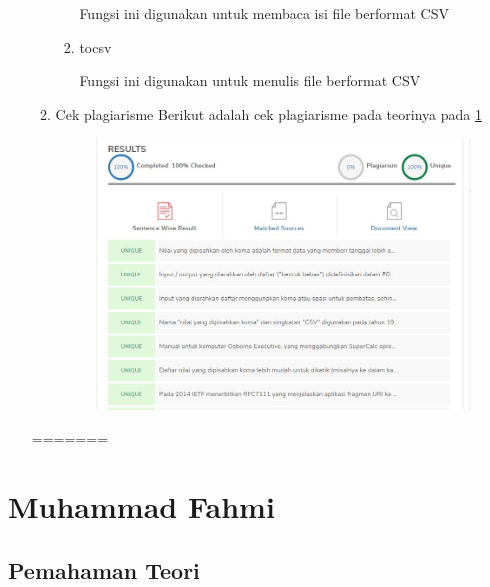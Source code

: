 \begin{enumerate}
\begin{enumerate}
\begin{enumerate}
		Fungsi ini digunakan untuk membaca isi file berformat CSV
		
		
		
		\item tocsv
		
		Fungsi ini digunakan untuk menulis file berformat CSV
		
		
		
	\end{enumerate}
   \item Cek plagiarisme
Berikut adalah cek plagiarisme pada teorinya pada \ref{Plagiarisme}
   \begin{figure}[H]
	\includegraphics[width=10cm]{figures/Rahma/Chapter4/Plagiarisme.jpg}
	\centering
    \label{Plagiarisme}
    \end{figure}

 \end{enumerate} 
=======
    
\end{enumerate}



\section{Muhammad Fahmi}
\subsection{Pemahaman Teori}

